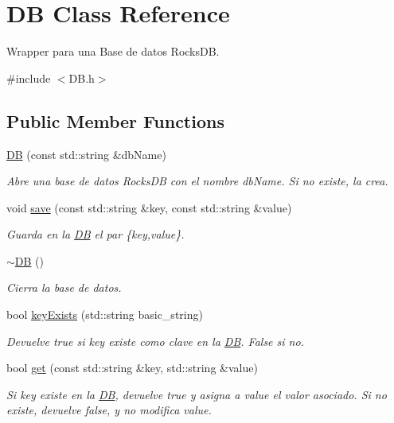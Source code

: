 \hypertarget{class_d_b}{}\section{D\+B Class Reference}
\label{class_d_b}


Wrapper para una Base de datos Rocks\+D\+B.  




{\ttfamily \#include $<$D\+B.\+h$>$}

\subsection*{Public Member Functions}
\begin{DoxyCompactItemize}
\item 
\hyperlink{class_d_b_a21b3bf24e76771294050e9894fdbceae}{D\+B} (const std\+::string \&db\+Name)
\begin{DoxyCompactList}\small\item\em Abre una base de datos Rocks\+D\+B con el nombre db\+Name. Si no existe, la crea. \end{DoxyCompactList}\item 
void \hyperlink{class_d_b_a050e986b62a71a5004a93e3885dfe14c}{save} (const std\+::string \&key, const std\+::string \&value)
\begin{DoxyCompactList}\small\item\em Guarda en la \hyperlink{class_d_b}{D\+B} el par \{key,value\}. \end{DoxyCompactList}\item 
\hyperlink{class_d_b_a7bd1418f67b11d0f752537123e7e6d28}{$\sim$\+D\+B} ()
\begin{DoxyCompactList}\small\item\em Cierra la base de datos. \end{DoxyCompactList}\item 
bool \hyperlink{class_d_b_ab74f50a79fa2f4a513fc1342bbc48b28}{key\+Exists} (std\+::string basic\+\_\+string)
\begin{DoxyCompactList}\small\item\em Devuelve true si key existe como clave en la \hyperlink{class_d_b}{D\+B}. False si no. \end{DoxyCompactList}\item 
bool \hyperlink{class_d_b_a50aa8411937cda0573b1d5f738588168}{get} (const std\+::string \&key, std\+::string \&value)
\begin{DoxyCompactList}\small\item\em Si key existe en la \hyperlink{class_d_b}{D\+B}, devuelve true y asigna a value el valor asociado. Si no existe, devuelve false, y no modifica value. \end{DoxyCompactList}\end{DoxyCompactItemize}



